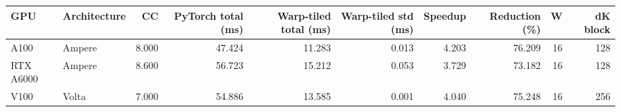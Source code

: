 \begin{tabular}{llrrrrrrrr}
\toprule
GPU & Architecture & CC & PyTorch total (ms) & Warp-tiled total (ms) & Warp-tiled std (ms) & Speedup & Reduction (\%) & W & dK block \\
\midrule
A100 & Ampere & 8.000 & 47.424 & 11.283 & 0.013 & 4.203 & 76.209 & 16 & 128 \\
RTX A6000 & Ampere & 8.600 & 56.723 & 15.212 & 0.053 & 3.729 & 73.182 & 16 & 128 \\
V100 & Volta & 7.000 & 54.886 & 13.585 & 0.001 & 4.040 & 75.248 & 16 & 256 \\
\bottomrule
\end{tabular}
